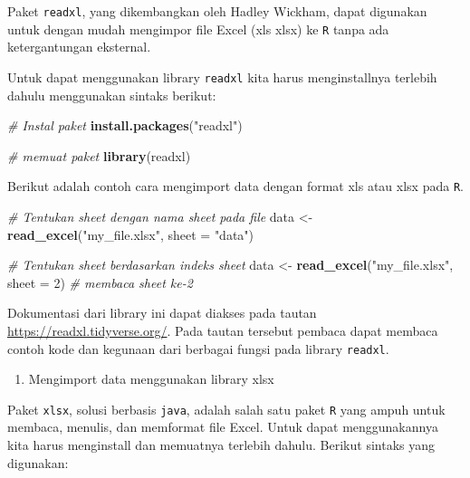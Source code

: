 \documentclass[]{book}
\newenvironment{Shaded}{\begin{snugshade}}{\end{snugshade}}
\newcommand{\KeywordTok}[1]{\textcolor[rgb]{0.13,0.29,0.53}{\textbf{#1}}}
\newcommand{\DataTypeTok}[1]{\textcolor[rgb]{0.13,0.29,0.53}{#1}}
\newcommand{\DecValTok}[1]{\textcolor[rgb]{0.00,0.00,0.81}{#1}}
\newcommand{\StringTok}[1]{\textcolor[rgb]{0.31,0.60,0.02}{#1}}
\newcommand{\CommentTok}[1]{\textcolor[rgb]{0.56,0.35,0.01}{\textit{#1}}}
\newcommand{\NormalTok}[1]{#1}
\providecommand{\tightlist}{%
  \setlength{\itemsep}{0pt}\setlength{\parskip}{0pt}}
\begin{document}
Paket \texttt{readxl}, yang dikembangkan oleh Hadley Wickham, dapat
digunakan untuk dengan mudah mengimpor file Excel (xls \textbar{} xlsx)
ke \texttt{R} tanpa ada ketergantungan eksternal.

Untuk dapat menggunakan library \texttt{readxl} kita harus
menginstallnya terlebih dahulu menggunakan sintaks berikut:

\begin{Shaded}
\begin{Highlighting}[]
\CommentTok{# Instal paket}
\KeywordTok{install.packages}\NormalTok{(}\StringTok{"readxl"}\NormalTok{)}

\CommentTok{# memuat paket}
\KeywordTok{library}\NormalTok{(readxl)}
\end{Highlighting}
\end{Shaded}

Berikut adalah contoh cara mengimport data dengan format xls atau xlsx
pada \texttt{R}.

\begin{Shaded}
\begin{Highlighting}[]
\CommentTok{# Tentukan sheet dengan nama sheet pada file}
\NormalTok{data <-}\StringTok{ }\KeywordTok{read_excel}\NormalTok{(}\StringTok{"my_file.xlsx"}\NormalTok{, }\DataTypeTok{sheet =} \StringTok{"data"}\NormalTok{)}

\CommentTok{# Tentukan sheet berdasarkan indeks sheet}
\NormalTok{data <-}\StringTok{ }\KeywordTok{read_excel}\NormalTok{(}\StringTok{"my_file.xlsx"}\NormalTok{, }\DataTypeTok{sheet =} \DecValTok{2}\NormalTok{) }\CommentTok{# membaca sheet ke-2}
\end{Highlighting}
\end{Shaded}

Dokumentasi dari library ini dapat diakses pada tautan
\url{https://readxl.tidyverse.org/}. Pada tautan tersebut pembaca dapat
membaca contoh kode dan kegunaan dari berbagai fungsi pada library
\texttt{readxl}.

\begin{enumerate}
\def\labelenumi{\alph{enumi}.}
\setcounter{enumi}{3}
\tightlist
\item
  Mengimport data menggunakan library xlsx
\end{enumerate}

Paket \texttt{xlsx}, solusi berbasis \texttt{java}, adalah salah satu
paket \texttt{R} yang ampuh untuk membaca, menulis, dan memformat file
Excel. Untuk dapat menggunakannya kita harus menginstall dan memuatnya
terlebih dahulu. Berikut sintaks yang digunakan:
\end{document}
